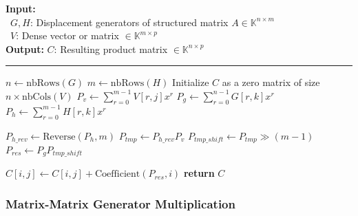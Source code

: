 \begin{algorithm}[H]
  \caption{Multiplication of displacement generators with a vector/matrix}

  \textbf{Input:} \\
  \hspace*{0.5cm} \textbullet \ $G, H$: Displacement generators of
  structured matrix $A \in \mathbb{K}^{n \times m}$ \\
  \hspace*{0.5cm} \textbullet \ $V$: Dense vector or matrix $\in
  \mathbb{K}^{m \times p}$ \\
  \textbf{Output:} $C$: Resulting product matrix $\in \mathbb{K}^{n \times p}$

  \vspace{0.15cm}
  \hrule
  \vspace{0.15cm}

  \begin{algorithmic}[1]
    \State $n \gets \text{nbRows}(G)$
    \State $m \gets \text{nbRows}(H)$
    \State Initialize $C$ as a zero matrix of size $n \times
    \text{nbCols}(V)$ 
    \State $P_v \gets \sum_{r=0}^{m-1} V[r, j] x^r$ 
    \State $P_g \gets \sum_{r=0}^{n-1} G[r, k] x^r$ 
    \State $P_h \gets \sum_{r=0}^{m-1} H[r, k] x^r$ 

    \State $P_{h\_rev} \gets \text{Reverse}(P_h, m)$ 
    \State $P_{tmp} \gets P_{h\_rev} P_v$ 
    \State $P_{tmp\_shift} \gets P_{tmp} \gg (m - 1)$ 
    \State $P_{res} \gets P_g P_{tmp\_shift}$ 

    \State $C[i, j] \gets C[i, j] + \text{Coefficient}(P_{res}, i)$
    \EndFor
    \EndFor
    \EndFor
    \State \textbf{return} $C$
    \EndFunction
  \end{algorithmic}
\end{algorithm}

\subsubsection{Matrix-Matrix Generator Multiplication}
\label{section:matrixmatrixmul}

